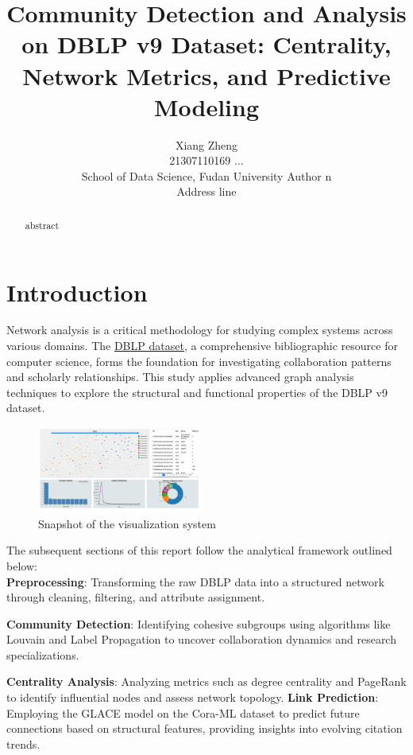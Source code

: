 \documentclass[11pt]{article}
\title{Community Detection and Analysis on DBLP v9 Dataset: Centrality, Network Metrics, and Predictive Modeling}
\author{
  Xiang Zheng \\ 21307110169 \And  
  ... 
  \vspace{0.7cm} \\ %
  \hfill School of Data Science, Fudan University \hfill
  \And
  Author n \\ Address line
}
\begin{document}
\maketitle
\begin{abstract}
	abstract
\end{abstract}

\section{Introduction}

Network analysis is a critical methodology for studying complex systems across various domains. The \href{https://www.aminer.cn/citation}{DBLP dataset}, a comprehensive bibliographic resource for computer science, forms the foundation for investigating collaboration patterns and scholarly relationships. This study applies advanced graph analysis techniques to explore the structural and functional properties of the DBLP v9 dataset.

\begin{figure}[ht]
	\centering
	\includegraphics[width=0.48\textwidth]{img/introduction/visualization.png}
	\caption{Snapshot of the visualization system}
	\label{fig:visua}
\end{figure}

The subsequent sections of this report follow the analytical framework outlined below:
\\

\textbf{Preprocessing}: Transforming the raw DBLP data into a structured network through cleaning, filtering, and attribute assignment.

\textbf{Community Detection}: Identifying cohesive subgroups using algorithms like Louvain and Label Propagation to uncover collaboration dynamics and research specializations.

\textbf{Centrality Analysis}: Analyzing metrics such as degree centrality and PageRank to identify influential nodes and assess network topology.
\textbf{Link Prediction}: Employing the GLACE model on the Cora-ML dataset to predict future connections based on structural features, providing insights into evolving citation trends.
\end{document}
